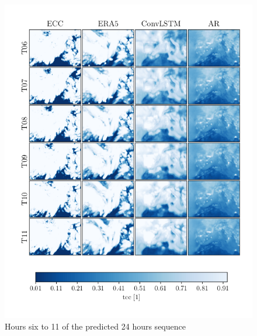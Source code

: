 \begin{figure}
    \centering
    \includegraphics{python_figs/comparing_seq_part_2_of4_jan2.png}
    \caption{Hours six to 11 of the  predicted 24 hours sequence }
    \label{fig:part2/4}
\end{figure}
